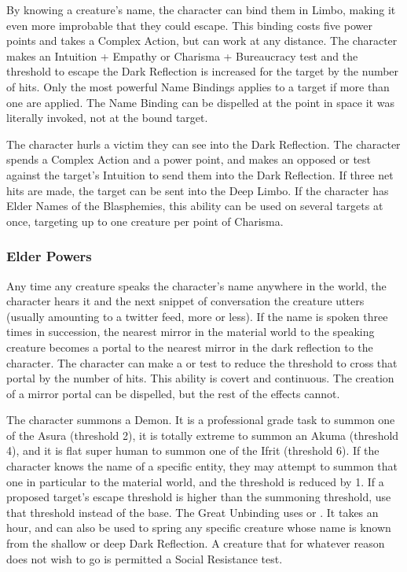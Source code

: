  By knowing a creature's name, the character can bind them in Limbo, making it even more improbable that they could escape. This binding costs five power points and takes a Complex Action, but can work at any distance. The character makes an Intuition + Empathy or Charisma + Bureaucracy test and the threshold to escape the Dark Reflection is increased for the target by the number of hits. Only the most powerful Name Bindings applies to a target if more than one are applied. The Name Binding can be dispelled at the point in space it was literally invoked, not at the bound target.

 The character hurls a victim they can see into the Dark Reflection. The character spends a Complex Action and a power point, and makes an opposed  or  test against the target's Intuition to send them into the Dark Reflection. If three net hits are made, the target can be sent into the Deep Limbo. If the character has Elder Names of the Blasphemies, this ability can be used on several targets at once, targeting up to one creature per point of Charisma.


\subsubsection{Elder Powers}

 Any time any creature speaks the character's name anywhere in the world, the character hears it and the next snippet of conversation the creature utters (usually amounting to a twitter feed, more or less). If the name is spoken three times in succession, the nearest mirror in the material world to the speaking creature becomes a portal to the nearest mirror in the dark reflection to the character. The character can make a  or  test to reduce the threshold to cross that portal by the number of hits. This ability is covert and continuous. The creation of a mirror portal can be dispelled, but the rest of the effects cannot.

 The character summons a Demon. It is a professional grade task to summon one of the Asura (threshold 2), it is totally extreme to summon an Akuma (threshold 4), and it is flat super human to summon one of the Ifrit (threshold 6). If the character knows the name of a specific entity, they may attempt to summon that one in particular to the material world, and the threshold is reduced by 1. If a proposed target's escape threshold is higher than the summoning threshold, use that threshold instead of the base. The Great Unbinding uses  or . It takes an hour, and can also be used to spring any specific creature whose name is known from the shallow or deep Dark Reflection. A creature that for whatever reason does not wish to go is permitted a Social Resistance test.


